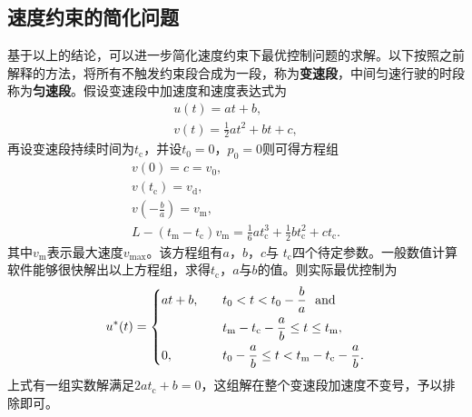 \subsection{速度约束的简化问题}
基于以上的结论，可以进一步简化速度约束下最优控制问题的求解。以下按照之前解释的方法，将所有不触发约束段合成为一段，称为\textbf{变速段}，中间匀速行驶的时段称为\textbf{匀速段}。假设变速段中加速度和速度表达式为
\begin{gather}
u(t)=at+b,\\
v(t)=\frac12at^2+bt+c,
\end{gather}
再设变速段持续时间为$t_\mathrm{c}$，并设$t_0=0$，$p_0=0$则可得方程组
\begin{gather}
v(0)=c=v_0,\label{eq:vopt:1}\\
v(t_\mathrm{c})=v_\mathrm{d},\\
v(-\frac ba)=v_\mathrm{m},\\
L-(t_\mathrm{m}-t_\mathrm{c})v_\mathrm{m}=\frac16at_\mathrm{c}^3+\frac12bt_\mathrm{c}^2+ct_\mathrm{c}.\label{eq:vopt:4}
\end{gather}
其中$v_\mathrm{m}$表示最大速度$v_{\max}$。该方程组有$a$，$b$，$c$与 $t_\mathrm{c}$四个待定参数。一般数值计算软件能够很快解出以上方程组，求得$t_\mathrm{c}$，$a$与$b$的值。则实际最优控制为
\begin{equation}
u^*(t)=
\begin{dcases}
at+b,\quad & t_0<t<t_0-\frac ba\ \text{ and}\\
\quad & t_\mathrm{m}-t_\mathrm{c}-\frac ab\leq t\leq t_\mathrm{m},\\
0,\quad & t_0-\frac ab \leq t < t_\mathrm{m}-t_\mathrm{c}-\frac ab.
\end{dcases}
\end{equation}
上式有一组实数解满足$2at_\mathrm{c}+b=0$，这组解在整个变速段加速度不变号，予以排除即可。

